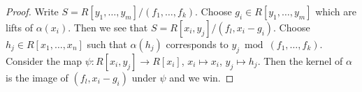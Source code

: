 \documentclass[10pt,a4paper]{amsart}
\theoremstyle{plain}
\theoremstyle{definition}
\theoremstyle{remark}
\numberwithin{equation}{subsection}
\begin{document}
\begin{proof}
Write $S = R[y_1, \ldots, y_m]/(f_1, \ldots, f_k)$.
Choose $g_i \in R[y_1, \ldots, y_m]$ which are lifts
of $\alpha(x_i)$. Then we see that $S = R[x_i, y_j]/(f_l, x_i - g_i)$.
Choose $h_j \in R[x_1, \ldots, x_n]$ such that $\alpha(h_j)$
corresponds to $y_j \bmod (f_1, \ldots, f_k)$. Consider
the map $\psi : R[x_i, y_j] \to R[x_i]$, $x_i \mapsto x_i$,
$y_j \mapsto h_j$. Then the kernel of $\alpha$
is the image of $(f_l, x_i - g_i)$ under $\psi$ and we win.
\end{proof}
\end{document}
